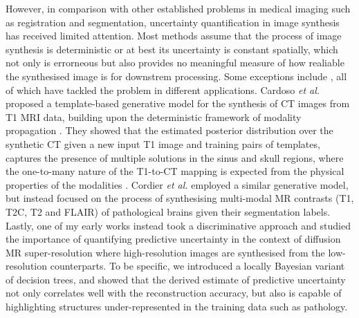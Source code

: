 However, in comparison with other established problems in medical imaging such as registration and segmentation, uncertainty quantification in image synthesis has received limited attention. Most methods assume that the process of image synthesis is deterministic or at best its uncertainty is constant spatially, which not only is errorneous but also provides no meaningful measure of how realiable the synthesised image is for downstrem processing. Some exceptions include \cite{cardoso2015template,cordier2016extended,tanno2016bayesian}, all of which have tackled the problem in different applications. Cardoso \textit{et al.} \cite{cardoso2015template} proposed a template-based generative model for the synthesis of CT images from T1 MRI data, building upon the deterministic framework of modality propagation \cite{ye2013modality}. They showed that the estimated posterior distribution over the synthetic CT given a new input T1 image and training pairs of templates, captures the presence of multiple solutions in the sinus and skull regions, where the one-to-many nature of the T1-to-CT mapping is expected from the physical properties of the modalities \cite{burgos2014attenuation}. Cordier \textit{et al.} \cite{cordier2016extended} employed a similar generative model, but instead focused on the process of synthesising multi-modal MR contrasts (T1, T2C, T2 and FLAIR) of pathological brains given their segmentation labels. Lastly, one of my early works \cite{tanno2016bayesian} instead took a discriminative approach and studied the importance of quantifying predictive uncertainty in the context of diffusion MR super-resolution where high-resolution images are synthesised from the low-resolution counterparts. To be specific, we introduced a locally Bayesian variant of decision trees, and showed that the derived estimate of predictive uncertainty not only correlates well with the reconstruction accuracy, but also is capable of highlighting structures under-represented in the training data such as pathology. 


